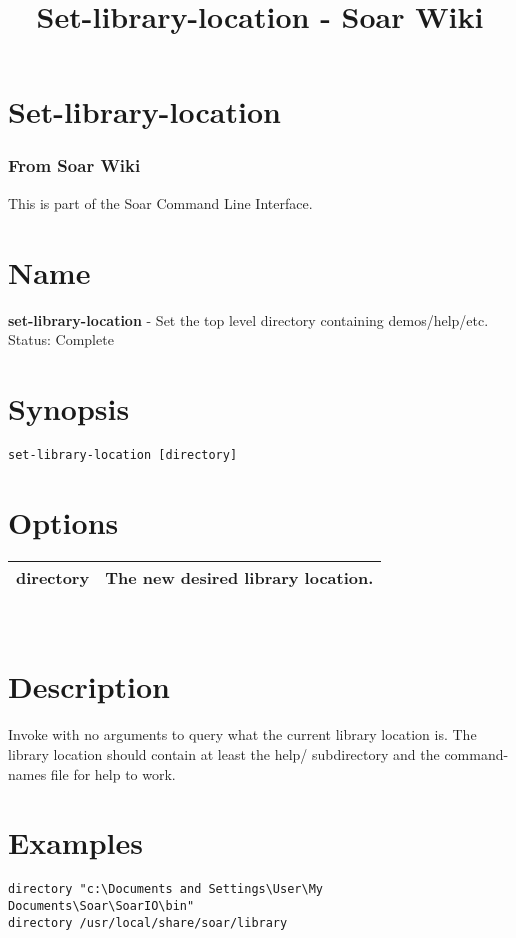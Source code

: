 \documentclass[10pt]{article}
\title{Set-library-location - Soar Wiki}
\begin{document}
\section*{Set-library-location}
\subsubsection*{From Soar Wiki}


 This is part of the Soar Command Line Interface. 
\section*{ Name }


 \textbf{set-library-location}
 - Set the top level directory containing demos/help/etc.\\ 
 Status: Complete
\section*{ Synopsis }
\begin{verbatim}
set-library-location [directory] 

\end{verbatim}
\section*{ Options }


\begin{tabular}{|p{1in}|p{5in}|}
\hline 
 directory  & The new desired library location.  \\
 \hline 

\end{tabular}



 \\ 

\section*{ Description }


 Invoke with no arguments to query what the current library location is. The library location should contain at least the help/ subdirectory and the command-names file for help to work. 
\section*{ Examples }
\begin{verbatim}
directory "c:\Documents and Settings\User\My Documents\Soar\SoarIO\bin"
directory /usr/local/share/soar/library

\end{verbatim}
\end{document}
